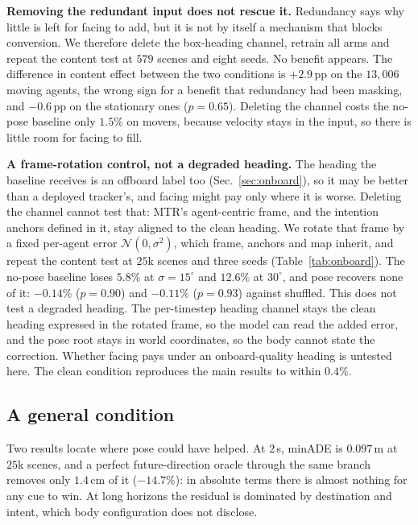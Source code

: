 \documentclass[conference]{IEEEtran}
\newcommand{\minADE}{minADE\xspace}
\begin{document}
\textbf{Removing the redundant input does not rescue it.} Redundancy says why
little is left for facing to add, but it is not by itself a mechanism that blocks
conversion. We therefore delete the box-heading channel, retrain all arms and repeat
the content test at $579$ scenes and eight seeds. No benefit appears. The
difference in content effect between the two conditions is $+2.9$\,pp on the
$13{,}006$ moving agents, the wrong sign for a benefit that redundancy
had been masking, and $-0.6$\,pp on the stationary ones ($p{=}0.65$). Deleting the channel
costs the no-pose baseline only $1.5\%$ on movers, because velocity stays in the
input, so there is little room for facing to fill.

\textbf{A frame-rotation control, not a degraded heading.} The heading the
baseline receives is an offboard label too (Sec.~\ref{sec:onboard}), so it may
be better than a deployed tracker's, and facing might pay only where it is
worse. Deleting the channel cannot test that: MTR's agent-centric frame, and
the intention anchors defined in it, stay aligned to the clean heading. We
rotate that frame by a fixed per-agent error $\mathcal{N}(0,\sigma^2)$, which
frame, anchors and map inherit, and repeat the content test at $25$k scenes
and three seeds (Table~\ref{tab:onboard}). The no-pose baseline loses $5.8\%$
at $\sigma{=}15^\circ$ and $12.6\%$ at $30^\circ$, and pose recovers none of
it: $-0.14\%$ ($p{=}0.90$) and $-0.11\%$ ($p{=}0.93$) against shuffled. This
does not test a degraded heading. The per-timestep heading channel stays the
clean heading expressed in the rotated frame, so the model can read the added
error, and the pose root stays in world coordinates, so the body cannot state
the correction. Whether facing pays under an onboard-quality heading is
untested here. The clean condition reproduces the main results to within $0.4\%$.

\subsection{A general condition}
Two results locate where pose could have helped. At $2$\,s, \minADE is
$0.097$\,m at $25$k scenes, and a perfect future-direction oracle through the same branch removes
only $1.4$\,cm of it ($-14.7\%$): in absolute terms there is almost nothing for
any cue to win. At long
horizons the residual is dominated by destination and intent, which body
configuration does not disclose.
\end{document}
